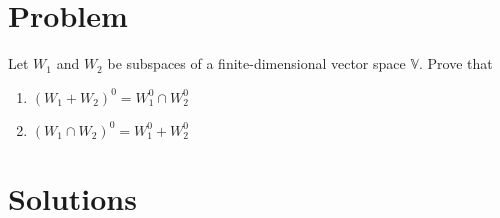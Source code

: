 \documentclass[journal,12pt]{IEEEtran}
\begin{document}
\renewcommand{\thefigure}{\theenumi}
\renewcommand{\thetable}{\theenumi}

\section{\textbf{Problem}}
Let $W_1$ and $W_2$ be subspaces of a finite-dimensional vector space $\mathbb V$. Prove that
\begin{enumerate}
    \item $(W_1 + W_2)^0 = W_1^0 \cap W_2^0$
    \item $(W_1 \cap W_2)^0 = W_1^0 + W_2^0$
\end{enumerate}
\section{\textbf{Solutions}}
\renewcommand{\thetable}{1}
\end{document}
